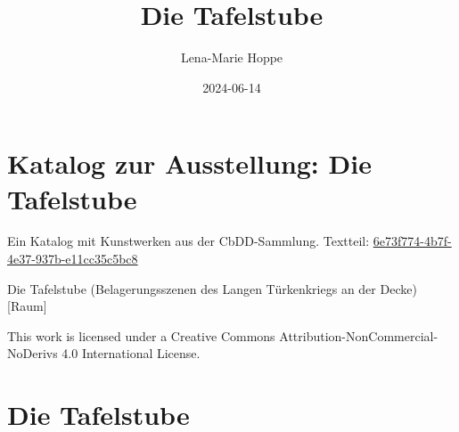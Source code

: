 \documentclass[
  letterpaper,
]{book}
\title{Die Tafelstube}
\author{Lena-Marie Hoppe}
\date{2024-06-14}
\renewcommand*\contentsname{Table of contents}
\newcommand\contentsname{Table of contents}
\begin{document}
\frontmatter
\maketitle

\renewcommand*\contentsname{Table of contents}
{
\setcounter{tocdepth}{2}
\tableofcontents
}
\mainmatter
{}

\chapter{Katalog zur Ausstellung: Die
Tafelstube}\label{katalog-zur-ausstellung-die-tafelstube}

Ein Katalog mit Kunstwerken aus der CbDD-Sammlung. Textteil:
\href{https://www.deckenmalerei.eu/42d06165-58e7-4653-bfe4-3d5f7091fc33\#6e73f774-4b7f-4e37-937b-e11cc35c5bc8}{6e73f774-4b7f-4e37-937b-e11cc35c5bc8}

Die Tafelstube (Belagerungsszenen des Langen Türkenkriegs an der Decke)
{[}Raum{]}

This work is licensed under a Creative Commons
Attribution-NonCommercial-NoDerivs 4.0 International License.


\chapter{Die Tafelstube}\label{die-tafelstube}
\end{document}
